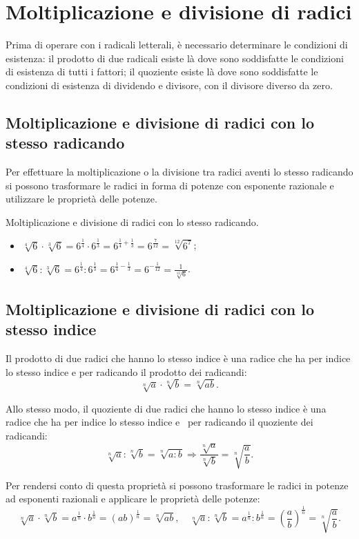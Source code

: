 \section{Moltiplicazione e divisione di radici}
Prima di operare con i radicali letterali, è necessario determinare le condizioni di esistenza: il prodotto di due radicali esiste là dove sono soddisfatte le condizioni di esistenza di tutti i fattori; il quoziente esiste là dove sono soddisfatte le condizioni di esistenza di dividendo e divisore, con il divisore diverso da zero.

\subsection{Moltiplicazione e divisione di radici con lo stesso radicando}
Per effettuare la moltiplicazione o la divisione tra radici aventi lo stesso radicando si possono trasformare le radici in forma di potenze con esponente razionale e utilizzare le proprietà delle potenze.

\begin{exrig}
 \begin{esempio}
Moltiplicazione e divisione di radici con lo stesso radicando.
\begin{itemize}
\item $\sqrt[4]6\cdot \sqrt[3]6=6^{\frac 1 4}\cdot 6^{\frac 1 3}=6^{\frac 1 4+\frac 1 3}=6^{\frac 7{12}}=\sqrt[12]{6^7}$;
\item $\sqrt[4]6:\sqrt[3]6=6^{\frac 1 4}:6^{\frac 1 3}=6^{\frac 1 4-\frac 1 3}=6^{-\frac 1{12}}=\frac 1{\sqrt[12]6}$.
\end{itemize}
 \end{esempio}
\end{exrig}

\subsection{Moltiplicazione e divisione di radici con lo stesso indice}
Il prodotto di due radici che hanno lo stesso indice è una radice che ha per indice lo stesso indice e per radicando il prodotto dei radicandi:
\[\sqrt[n]a\cdot \sqrt[n]b=\sqrt[n]{ab}.\]

Allo stesso modo, il quoziente di due radici che hanno lo stesso indice è una radice che ha per indice lo stesso indice e \ per radicando il quoziente dei radicandi:
\[\sqrt[n]a:\sqrt[n]b=\sqrt[n]{a:b} \Rightarrow \dfrac{\sqrt[n]a}{\sqrt[n]b}=\sqrt[n]{\dfrac a b}.\]

Per rendersi conto di questa proprietà si possono trasformare le radici in potenze ad esponenti razionali e applicare le proprietà delle potenze:
 \[\sqrt[n]a\cdot \sqrt[n]b=a^{\frac 1 n}\cdot b^{\frac 1 n}=(ab)^{\frac 1 n}=\sqrt[n]{ab},\quad \sqrt[n]a:\sqrt[n]b=a^{\frac 1 n}:b^{\frac 1 n}=\left(\dfrac a b\right)^{\frac 1 n}=\sqrt[n]{\dfrac a b}.\]

